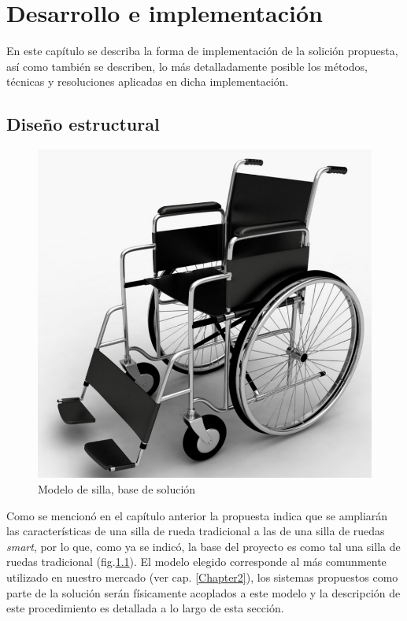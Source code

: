 
\chapter{Desarrollo e implementaci\'on} %

\label{Chapter4} %



En este cap\'itulo se describa la forma de implementaci\'on de la solici\'on
propuesta, as\'i como tambi\'en se describen, lo m\'as detalladamente posible
los m\'etodos, t\'ecnicas y resoluciones aplicadas en dicha implementaci\'on.

\section{Dise\~no estructural}

\begin{figure}[th]
    \centering
    \includegraphics[width=.5\textwidth]{Figures/wheelchair.png}
    \decoRule
    \caption{Modelo de silla, base de soluci\'on}
    \label{fig:wheelchair}
\end{figure}

Como se mencion\'o en el cap\'itulo anterior la propuesta indica que se
ampliar\'an las caracter\'isticas de una silla de rueda tradicional a las de una
silla de ruedas \emph{smart}, por lo que, como ya se indic\'o, la base del
proyecto es como tal una silla de ruedas tradicional (fig.\ref{fig:wheelchair}).
El modelo elegido corresponde al m\'as comunmente utilizado en nuestro mercado
(ver cap. \ref{Chapter2}), los sistemas propuestos como parte de la soluci\'on
ser\'an f\'isicamente acoplados a este modelo y la descripci\'on de este
procedimiento es detallada a lo largo de esta secci\'on.

